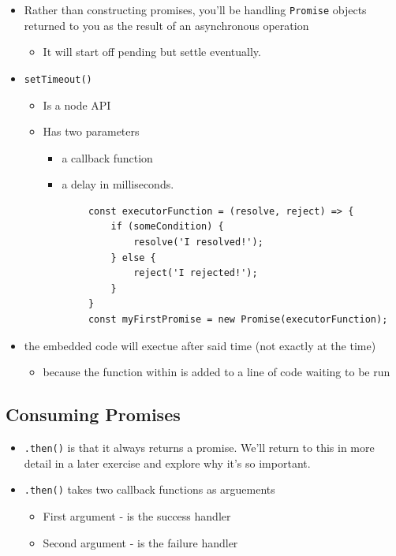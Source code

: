 \documentclass[12pt]{article}
\begin{document}
\begin{itemize}

    \item Rather than constructing promises, you’ll be handling \texttt{Promise} objects returned to you as the result of an asynchronous operation
    \begin{itemize}
        \item It will start off pending but settle eventually.
    \end{itemize}

    \item \texttt{setTimeout()}
    \begin{itemize}
        \item Is a node API
        \item Has two parameters
        \begin{itemize}
            \item a callback function
            \item a delay in milliseconds.
        \end{itemize}

        \begin{lstlisting}
        const executorFunction = (resolve, reject) => {
            if (someCondition) {
                resolve('I resolved!');
            } else {
                reject('I rejected!');
            }
        }
        const myFirstPromise = new Promise(executorFunction);
        \end{lstlisting}

    \end{itemize}

    \item the embedded code will exectue after said time (not exactly at the time)
    \begin{itemize}
        \item because the function within is added to a line of code waiting to be run
    \end{itemize}
\end{itemize}

\subsection{Consuming Promises}
\begin{itemize}
    \item \texttt{.then()} is that it always returns a promise. We’ll return to this in more detail in a later exercise and explore why it’s so important.
    \item \texttt{.then()} takes two callback functions as arguements
    \begin{itemize}
        \item First argument - is the success handler
        \item Second argument - is the failure handler
    \end{itemize}
\end{itemize}
\end{document}
